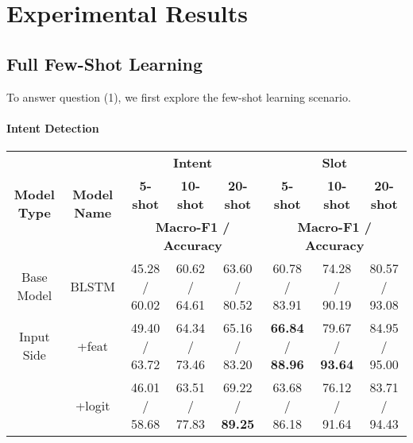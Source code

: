 \section{Experimental Results}
\label{sec:experiments}

\subsection{Full Few-Shot Learning}
To answer question (1), we first explore the few-shot learning scenario.

\paragraph{Intent Detection}

\begin{table*}
\setlength{\tabcolsep}{0.23em}
\centering
\small{
\begin{tabular}{|c|c|c|c|c|c|c|c|}

\hline
\multirow{3}{*}{\textbf{Model Type}} & \multirow{3}{*}{\textbf{Model Name}}  & \multicolumn{3}{|c|}{\textbf{Intent}} & \multicolumn{3}{|c|}{\textbf{Slot}} \\
\cline{3-8}
&  & \multicolumn{1}{|c|}{\textbf{5-shot}} & \multicolumn{1}{|c|}{\textbf{10-shot}} & \multicolumn{1}{|c|}{\textbf{20-shot}}
& \multicolumn{1}{|c|}{\textbf{5-shot}} & \multicolumn{1}{|c|}{\textbf{10-shot}} & \multicolumn{1}{|c|}{\textbf{20-shot}}  \\
\cline{3-8}
&  & \multicolumn{3}{|c|}{\textbf{Macro-F1 / Accuracy}} & \multicolumn{3}{|c|}{\textbf{Macro-F1 / Accuracy}} \\
\hline

\rowcolor{Gray}Base Model & BLSTM & 45.28 / 60.02 & 60.62 / 64.61 & 63.60 / 80.52
& 60.78 / 83.91 & 74.28  / 90.19 & 80.57 / 93.08  \\
\hline
Input Side & +feat & 49.40 / 63.72 & 64.34 / 73.46 & 65.16 / 83.20
& \textbf{66.84} / \textbf{88.96} & 79.67 / \textbf{93.64} & 84.95 / 95.00  \\
\hline

\rowcolor{Gray}  & +logit & 46.01 / 58.68 & 63.51 / 77.83 & 69.22 / \textbf{89.25}
& 63.68 / 86.18 & 76.12 / 91.64  & 83.71 / 94.43 \\
\cline{2-8}


\end{tabular}}
\end{table*}
